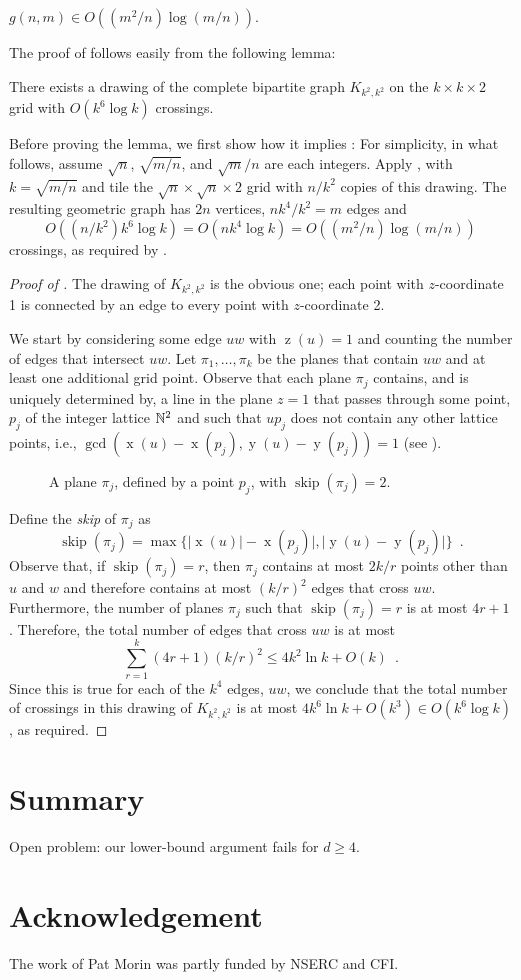 \documentclass{patmorin}
\DeclareMathOperator{\x}{x}
\DeclareMathOperator{\y}{y}
\DeclareMathOperator{\z}{z}
\DeclareMathOperator{\skp}{skip}
\begin{document}
\begin{thm}
  $g(n,m) \in O((m^2/n)\log (m/n))$.
\end{thm}

The proof of  follows easily from the following lemma:
\begin{lem}
  There exists a drawing of the complete bipartite graph $K_{k^2,k^2}$
  on the $k\times k\times 2$ grid with $O(k^6\log k)$ crossings.
\end{lem}

Before proving the lemma, we first show how it implies
: For simplicity, in what follows, assume $\sqrt{n}$,
$\sqrt{m/n}$, and $\sqrt{m}/n$ are each integers.  Apply ,
with $k=\sqrt{m/n}$ and tile the $\sqrt{n}\times\sqrt{n}\times 2$ grid
with $n/k^2$ copies of this drawing. The resulting geometric graph has
$2n$ vertices, $nk^4/k^2=m$ edges and
\[ O((n/k^2)k^6\log k) = O(nk^4\log k) = O((m^2/n)\log(m/n))
\] 
crossings, as required by .

\begin{proof}[Proof of ]
The drawing of $K_{k^2,k^2}$ is the obvious one; each point with
$z$-coordinate 1 is connected by an edge to every point with
$z$-coordinate 2.  

We start by considering some edge $uw$ with $\z(u)=1$ and counting
the number of edges that intersect $uw$.  Let $\pi_1,\ldots,\pi_k$ be
the planes that contain $uw$ and at least one additional grid point.
Observe that each plane $\pi_j$ contains, and is uniquely determined by,
a line in the plane $z=1$ that passes through some point, $p_j$ of the
integer lattice $\mathbb{N}^2$ and such that $up_j$ does not contain any other
lattice points, i.e., $\gcd(\x(u)-\x(p_j),\y(u)-\y(p_j))=1$ (see ).
\begin{figure}
  \caption{A plane $\pi_j$, defined by a point $p_j$, with $\skp(\pi_j)=2$.}
\end{figure}
Define the \emph{skip} of $\pi_j$ as
\[
   \skp(\pi_j)=\max\{|\x(u)|-\x(p_j)|,|\y(u)-\y(p_j)|\} \enspace .
\]
Observe that, if $\skp(\pi_j)=r$, then $\pi_j$ contains at most $2k/r$
points other than $u$ and $w$ and therefore contains at most $(k/r)^2$
edges that cross $uw$.  Furthermore, the number of planes $\pi_j$ such
that $\skp(\pi_j)=r$ is at most $4r+1$.  Therefore, the total number
of edges that cross $uw$ is at most
\[
   \sum_{r=1}^k (4r+1)(k/r)^2 \le 4k^2\ln k + O(k) \enspace .
\]
Since this is true for each of the $k^4$ edges, $uw$, we conclude that
the total number of crossings in this drawing of $K_{k^2,k^2}$ is at
most $4k^6\ln k+O(k^3)\in O(k^6\log k)$, as required.
\end{proof}

\section{Summary}


Open problem: our lower-bound argument fails for $d\ge 4$.

\section*{Acknowledgement}

The work of Pat Morin was partly funded by NSERC and CFI.



\end{document}
